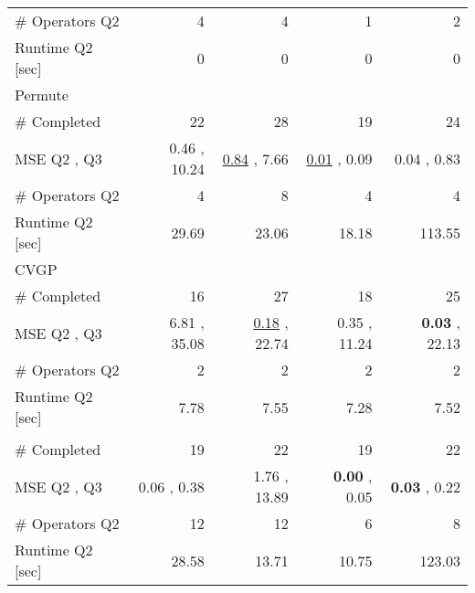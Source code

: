 \begin{tabularx}{\textwidth}{lRRRR}
\qquad \# Operators Q2  &  4\phantom{.00}  &  4\phantom{.00}  &  1\phantom{.00}  &  2\phantom{.00}  \\ 
\qquad Runtime Q2 [sec]  &  0\phantom{.00}  &  0\phantom{.00}  &  0\phantom{.00}  &  0\phantom{.00}  \\ 
Permute  &     &     &     &     \\ 
\qquad  \# Completed  &  22\phantom{.00}  &  28\phantom{.00}  &  19\phantom{.00}  &  24\phantom{.00}  \\ 
\qquad MSE Q2 ,  Q3  &  0.46  ,  10.24  &  \underline{0.84}  ,  7.66  &  \underline{0.01}  ,  0.09  &  0.04  ,  0.83  \\ 
\qquad \# Operators Q2  &  4\phantom{.00}  &  8\phantom{.00}  &  4\phantom{.00}  &  4\phantom{.00}  \\ 
\qquad Runtime Q2 [sec]  &  29.69  &  23.06  &  18.18  &  113.55  \\ 
CVGP  &     &     &     &     \\ 
\qquad  \# Completed  &  16\phantom{.00}  &  27\phantom{.00}  &  18\phantom{.00}  &  25\phantom{.00}  \\ 
\qquad MSE Q2 ,  Q3  &  6.81  ,  35.08  &  \underline{0.18}  ,  22.74  &  0.35  ,  11.24  &  \textbf{0.03}  ,  22.13  \\ 
\qquad \# Operators Q2  &  2\phantom{.00}  &  2\phantom{.00}  &  2\phantom{.00}  &  2\phantom{.00}  \\ 
\qquad Runtime Q2 [sec]  &  7.78  &  7.55  &  7.28  &  7.52  \\ 
\ours{}  &     &     &     &     \\ 
\qquad  \# Completed  &  19\phantom{.00}  &  22\phantom{.00}  &  19\phantom{.00}  &  22\phantom{.00}  \\ 
\qquad MSE Q2 ,  Q3  &  0.06  ,  0.38  &  1.76  ,  13.89  &  \textbf{0.00}  ,  0.05  &  \textbf{0.03}  ,  0.22  \\ 
\qquad \# Operators Q2  &  12\phantom{.00}  &  12\phantom{.00}  &  6\phantom{.00}  &  8\phantom{.00}  \\ 
\qquad Runtime Q2 [sec]  &  28.58  &  13.71  &  10.75  &  123.03  \\ 
\bottomrule
\end{tabularx}{\textwidth}
